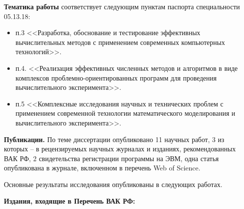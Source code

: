 \textbf{Тематика работы} соответствует следующим пунктам паспорта специальности 05.13.18:
\begin{itemize}
	\item п.3 <<Разработка, обоснование и тестирование эффективных вычислительных методов с применением современных компьютерных технологий>>.
	\item п.4. <<Реализация эффективных численных методов и алгоритмов в виде комплексов проблемно-ориентированных программ для проведения вычислительного эксперимента>>.
	\item п.5 <<Комплексные исследования научных и технических проблем с применением современной технологии математического моделирования и вычислительного эксперимента>>.
\end{itemize}

\textbf{Публикации.} По теме диссертации опубликовано 11 научных работ, 3 из которых – в рецензируемых научных журналах и изданиях, рекомендованных ВАК РФ, 2 свидетельства регистрации программы на ЭВМ, одна статья опубликована в журнале, включенном в перечень Web of Science.

Основные результаты исследования опубликованы в следующих работах.

\textbf{Издания, входящие в Перечень ВАК РФ:}

